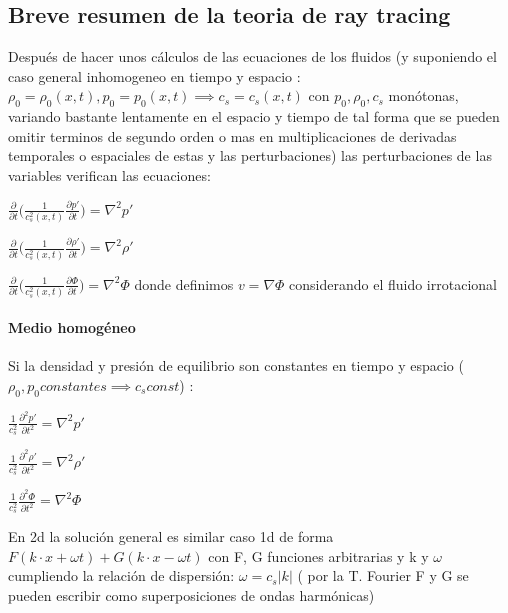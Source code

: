 \documentclass{article}
\begin{document}
\subsection{Breve resumen de la teoria de ray tracing}
\begin{description}
\item Después de hacer unos cálculos de las ecuaciones de los fluidos (y suponiendo el caso general inhomogeneo en tiempo y espacio : 
$\rho_0 = \rho_0(x,t),p_0 = p_0(x,t) \implies c_s = c_s(x,t)$ 
con  $p_0, \rho_0, c_s$  monótonas, variando bastante lentamente en el espacio y tiempo de tal forma que se pueden omitir terminos de segundo orden o mas en multiplicaciones de derivadas temporales o espaciales de estas y las perturbaciones) las perturbaciones de las variables verifican las ecuaciones: 

\item $\frac{\partial}{\partial t} \big(\frac{1}{c_s^{2}(x,t)} \frac{\partial p\prime}{\partial t}\big) = \nabla^{2} p\prime    $
\item $\frac{\partial}{\partial t} \big(\frac{1}{c_s^{2}(x,t)} \frac{\partial \rho\prime}{\partial t}\big) = \nabla^{2} \rho\prime    $
\item $\frac{\partial}{\partial t} \big(\frac{1}{c_s^{2}(x,t)} \frac{\partial \Phi}{\partial t}\big) = \nabla^{2} \Phi $ donde definimos  $v = \nabla \Phi$ considerando el fluido irrotacional

\end{description}  

\paragraph{Medio homogéneo}

\begin{description}  
\item Si la densidad y presión de equilibrio son constantes en tiempo y espacio ($\rho_0, p_0 constantes \implies c_s const$) :
\item $\frac{1}{c_s^{2}} \frac{\partial^{2} p\prime}{\partial t^{2}} = \nabla^{2} p\prime    $
\item $\frac{1}{c_s^{2}} \frac{\partial^{2} \rho\prime}{\partial t^{2}} = \nabla^{2} \rho\prime    $
\item $\frac{1}{c_s^{2}} \frac{\partial^{2} \Phi}{\partial t^{2}} = \nabla^{2} \Phi    $
\item En 2d  la solución general es similar caso 1d de forma $F(k\cdot x+ \omega t) + G(k \cdot x- \omega t)$ con F, G funciones arbitrarias y  k y $\omega$ cumpliendo la relación de dispersión: $\omega = c_s |k|$ 
( por la T. Fourier F y G se pueden escribir como superposiciones de ondas harmónicas) 

\end{description}  
\end{document}
